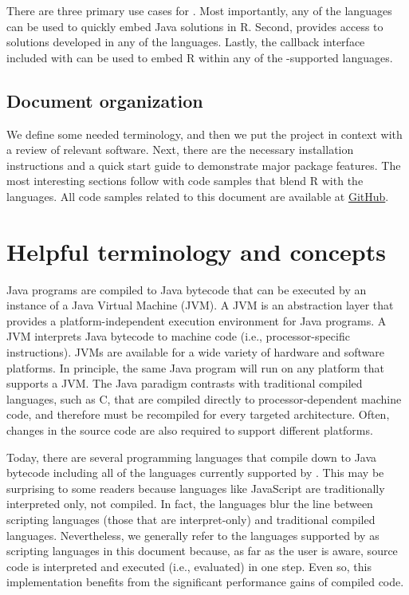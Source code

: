 There are three primary use cases for . Most importantly, any of the  languages can be used to quickly embed Java solutions in R. Second,  provides access to solutions developed in any of the  languages. Lastly, the callback interface included with  can be used to embed R within any of the -supported languages.

\subsection{Document organization}

We define some needed terminology, and then we put the  project in context with a review of relevant software. Next, there are the necessary installation instructions and a quick start guide to demonstrate major package features. The most interesting sections follow with code samples that blend R with the  languages. All code samples related to this document are available at \href{https://github.com/floidgilbert/jsr223}{GitHub}.

\section{Helpful terminology and concepts}

Java programs are compiled to Java bytecode that can be executed by an instance of a Java Virtual Machine (JVM). A JVM is an abstraction layer that provides a platform-independent execution environment for Java programs. A JVM interprets Java bytecode to machine code (i.e., processor-specific instructions). JVMs are available for a wide variety of hardware and software platforms. In principle, the same Java program will run on any platform that supports a JVM. The Java paradigm contrasts with traditional compiled languages, such as C, that are compiled directly to processor-dependent machine code, and therefore must be recompiled for every targeted architecture. Often, changes in the source code are also required to support different platforms.

Today, there are several programming languages that compile down to Java bytecode including all of the languages currently supported by . This may be surprising to some readers because languages like JavaScript are traditionally interpreted only, not compiled. In fact, the  languages blur the line between scripting languages (those that are interpret-only) and traditional compiled languages. Nevertheless, we generally refer to the languages supported by  as scripting languages in this document because, as far as the user is aware, source code is interpreted and executed (i.e., evaluated) in one step. Even so, this implementation benefits from the significant performance gains of compiled code.

